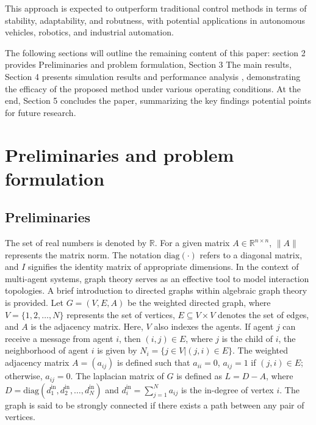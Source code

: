 \documentclass[journal,onecolumn]{IEEEtran}
\begin{document}
This approach is expected to outperform traditional control methods in terms of stability, adaptability, and robutness, with potential applications in autonomous vehicles, robotics, and industrial automation.




    The following sections will outline the remaining content of this paper:
    section 2 provides Preliminaries and problem formulation, Section 3 The main results, Section 4 presents simulation results and performance analysis , demonstrating the efficacy of the proposed method under various operating conditions.
    At the end, Section 5 concludes the paper, summarizing the key findings potential points for future research.


\section{Preliminaries and problem formulation}\label{section:2}
\subsection{Preliminaries}



The set of real numbers is denoted by $\mathbb{R}$. For a given matrix $A \in \mathbb{R}^{n \times n}$, $\|A\|$ represents the matrix norm. The notation $\text{diag}(\cdot)$ refers to a diagonal matrix, and $I$ signifies the identity matrix of appropriate dimensions. In the context of multi-agent systems, graph theory serves as an effective tool to model interaction topologies. A brief introduction to directed graphs within algebraic graph theory is provided. Let $G = (V, E, A)$ be the weighted directed graph, where $V = \{1, 2, \dots, N\}$ represents the set of vertices, $E \subseteq V \times V$ denotes the set of edges, and $A$ is the adjacency matrix. Here, $V$ also indexes the agents. If agent $j$ can receive a message from agent $i$, then $(i,j) \in E$, where $j$ is the child of $i$, the neighborhood of agent $i$ is given by $N_i = \{j \in V | (j,i) \in E \}$. The weighted adjacency matrix $A = (a_{ij})$ is defined such that $a_{ii} = 0$, $a_{ij} = 1$ if $(j,i) \in E$; otherwise, $a_{ij} = 0$. The laplacian matrix of $G$ is defined as $L = D - A$, where $D = \text{diag}(d_1^{\text{in}}, d_2^{\text{in}}, \dots, d_N^{\text{in}})$ and $d_i^{\text{in}} = \sum_{j=1}^{N} a_{i j}$ is the in-degree of vertex $i$. The graph is said to be strongly connected if there exists a path between any pair of vertices.
\end{document}
